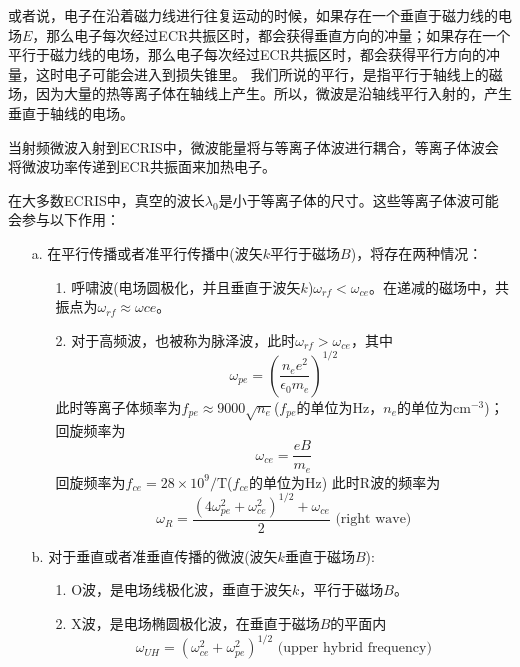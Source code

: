 \documentclass{article}
\begin{document}
或者说，电子在沿着磁力线进行往复运动的时候，如果存在一个垂直于磁力线的电场$E$，那么电子每次经过ECR共振区时，都会获得垂直方向的冲量；如果存在一个平行于磁力线的电场，那么电子每次经过ECR共振区时，都会获得平行方向的冲量，这时电子可能会进入到损失锥里。
我们所说的平行，是指平行于轴线上的磁场，因为大量的热等离子体在轴线上产生。所以，微波是沿轴线平行入射的，产生垂直于轴线的电场。

当射频微波入射到ECRIS中，微波能量将与等离子体波进行耦合，等离子体波会将微波功率传递到ECR共振面来加热电子。

在大多数ECRIS中，真空的波长$\lambda_0$是小于等离子体的尺寸。这些等离子体波可能会参与以下作用：

\begin{enumerate}
    \item [a.]在平行传播或者准平行传播中(波矢$k$平行于磁场$B$)，将存在两种情况：
    \begin{enumerate}
        \item[1.]呼啸波(电场圆极化，并且垂直于波矢$k$)$\omega_{rf}<\omega_{ce}$。在递减的磁场中，共振点为$\omega_{rf}\approx\omega{ce}$。\
        \item[2.]对于高频波，也被称为脉泽波，此时$\omega_{rf}>\omega_{ce}$，其中
        \begin{equation}
            \omega_{pe}=(\frac{n_ee^2}{\epsilon_0m_e})^{1/2}
        \end{equation}
        此时等离子体频率为$f_{pe}\approx9000\sqrt{n_e}$($f_{pe}$的单位为Hz，$n_e$的单位为cm$^{-3}$)；回旋频率为
        \begin{equation}
            \omega_{ce}=\frac{eB}{m_e}
        \end{equation}
        回旋频率为$f_{ce}=28\times10^9/\text{T}$($f_{ce}$的单位为Hz)
        此时R波的频率为
        \begin{equation}
            \omega_R=\frac{(4\omega_{pe}^2+\omega_{ce}^2)^{1/2}+\omega_{ce}}{2} \text{  (right wave)}
        \end{equation}
    \end{enumerate}
    \item[b.]对于垂直或者准垂直传播的微波(波矢$k$垂直于磁场$B$):
    \begin{enumerate}
        \item [1.]O波，是电场线极化波，垂直于波矢$k$，平行于磁场$B$。
        \item [2.]X波，是电场椭圆极化波，在垂直于磁场$B$的平面内
        \begin{equation}
            \omega_{UH}=(\omega_{ce}^2+\omega_{pe}^2)^{1/2}\text{  (upper hybrid frequency)}

\end{equation}
\end{enumerate}
\end{enumerate}
\end{document}

